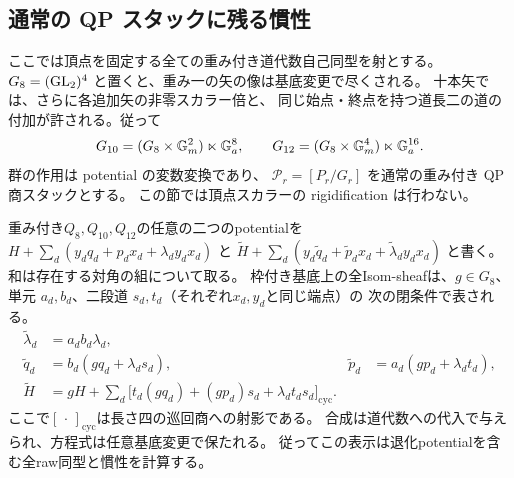 \subsection{通常の QP スタックに残る慣性}

ここでは頂点を固定する全ての重み付き道代数自己同型を射とする。
$G_8=(\operatorname{GL}_2)^4$ と置くと、重み一の矢の像は基底変更で尽くされる。
十本矢では、さらに各追加矢の非零スカラー倍と、
同じ始点・終点を持つ道長二の道の付加が許される。従って
\[
 G_{10}=(G_8\times\mathbb G_m^2)\ltimes\mathbb G_a^8,
 \qquad
 G_{12}=(G_8\times\mathbb G_m^4)\ltimes\mathbb G_a^{16}.
\]
群の作用は potential の変数変換であり、
$\mathcal P_r=[P_r/G_r]$ を通常の重み付き QP 商スタックとする。
この節では頂点スカラーの rigidification は行わない。

\begin{proposition}
\label{prop:qa-raw-qp-isom-equations}
重み付き$Q_8,Q_{10},Q_{12}$の任意の二つのpotentialを
$H+\sum_d(y_dq_d+p_dx_d+\lambda_dy_dx_d)$ と
$\widetilde H+\sum_d(y_d\widetilde q_d+\widetilde p_dx_d+
\widetilde\lambda_d y_dx_d)$ と書く。和は存在する対角の組について取る。
枠付き基底上の全Isom-sheafは、$g\in G_8$、単元
$a_d,b_d$、二段道 $s_d,t_d$（それぞれ$x_d,y_d$と同じ端点）の
次の閉条件で表される。
\[
\begin{aligned}
\widetilde\lambda_d &=a_db_d\lambda_d,\\
\widetilde q_d &= b_d(gq_d+\lambda_ds_d),&
\widetilde p_d &=a_d(gp_d+\lambda_dt_d),\\
\widetilde H &=gH+
\sum_d\bigl[t_d(gq_d)+(gp_d)s_d+\lambda_dt_ds_d\bigr]_{\mathrm{cyc}}.
\end{aligned}
\]
ここで$[\,\cdot\,]_{\mathrm{cyc}}$は長さ四の巡回商への射影である。
合成は道代数への代入で与えられ、方程式は任意基底変更で保たれる。
従ってこの表示は退化potentialを含む全raw同型と慣性を計算する。
\end{proposition}
